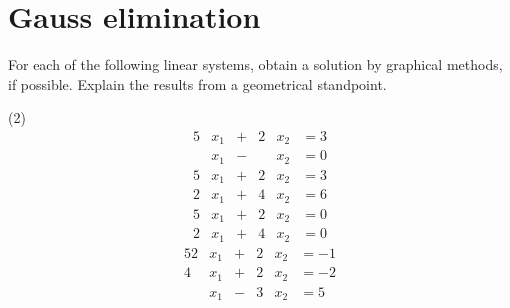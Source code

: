 \documentclass[../../../../Assignments]{subfiles}
\begin{document}
\section{Gauss elimination}

\begin{exercise}
    For each of the following linear systems, obtain a solution by graphical
    methods, if possible. Explain the results from a geometrical standpoint.

    \begin{tasks}(2)
        \task
            \begin{alignat*}{5}
                &x_1 &{}+{}& 2&x_2 &{}= 3 \\
                &x_1 &{}-{}&  &x_2 &{}= 0
            \end{alignat*}
        \task
            \begin{alignat*}{5}
                 &x_1 &{}+{}& 2&x_2 &{}= 3 \\
                2&x_1 &{}+{}& 4&x_2 &{}= 6
            \end{alignat*}
        \task
            \begin{alignat*}{5}
                 &x_1 &{}+{}& 2&x_2 &{}= 0 \\
                2&x_1 &{}+{}& 4&x_2 &{}= 0
            \end{alignat*}
        \task
            \begin{alignat*}{5}
                2&x_1 &{}+{}& 2&x_2 &{}= -1 \\
                4&x_1 &{}+{}& 2&x_2 &{}= -2 \\
                 &x_1 &{}-{}& 3&x_2 &{}=  5
            \end{alignat*}
    \end{tasks}
\end{exercise}
\end{document}
